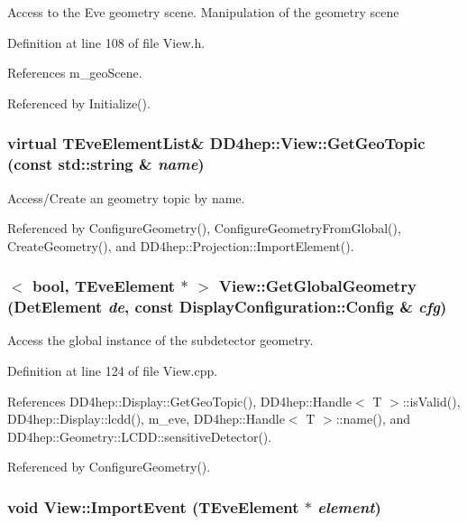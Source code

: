 Access to the Eve geometry scene. Manipulation of the geometry scene 

Definition at line 108 of file View.h.

References m\_\-geoScene.

Referenced by Initialize().\hypertarget{class_d_d4hep_1_1_view_a17ec5ded122ee85a4231ca4976f5b9bd}{
\subsubsection[{GetGeoTopic}]{\setlength{\rightskip}{0pt plus 5cm}virtual {\bf TEveElementList}\& DD4hep::View::GetGeoTopic (const std::string \& {\em name})}}
\label{class_d_d4hep_1_1_view_a17ec5ded122ee85a4231ca4976f5b9bd}


Access/Create an geometry topic by name. 

Referenced by ConfigureGeometry(), ConfigureGeometryFromGlobal(), CreateGeometry(), and DD4hep::Projection::ImportElement().\hypertarget{class_d_d4hep_1_1_view_aeb658c5dde010976060874d2ad48107f}{
\subsubsection[{GetGlobalGeometry}]{$<$ bool, TEveElement $\ast$ $>$ View::GetGlobalGeometry ({\bf DetElement} {\em de}, \/  const {\bf DisplayConfiguration::Config} \& {\em cfg})}}
\label{class_d_d4hep_1_1_view_aeb658c5dde010976060874d2ad48107f}


Access the global instance of the subdetector geometry. 

Definition at line 124 of file View.cpp.

References DD4hep::Display::GetGeoTopic(), DD4hep::Handle$<$ T $>$::isValid(), DD4hep::Display::lcdd(), m\_\-eve, DD4hep::Handle$<$ T $>$::name(), and DD4hep::Geometry::LCDD::sensitiveDetector().

Referenced by ConfigureGeometry().\hypertarget{class_d_d4hep_1_1_view_a3fcf261f808c5ed9687f864286309123}{
\subsubsection[{ImportEvent}]{\setlength{\rightskip}{0pt plus 5cm}void View::ImportEvent (TEveElement $\ast$ {\em element})}}
\label{class_d_d4hep_1_1_view_a3fcf261f808c5ed9687f864286309123}



